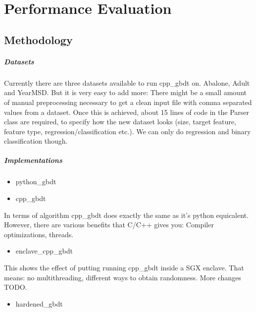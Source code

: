 \chapter{Performance Evaluation}

\section{Methodology}

\paragraph{Datasets}
Currently there are three datasets available to run cpp\_gbdt on. Abalone, Adult and YearMSD. But it is very easy to add more: There might be a small amount of manual preprocessing necessary to get a clean input file with comma separated values from a dataset. Once this is achieved, about 15 lines of code in the Parser class are required, to specify how the new dataset looks (size, target feature, feature type, regression/classification etc.). We can only do regression and binary classification though.

\paragraph{Implementations}

\begin{itemize}
    \item python\_gbdt
\end{itemize}

\begin{itemize}
    \item cpp\_gbdt
\end{itemize}

In terms of algorithm cpp\_gbdt does exactly the same as it's python equicalent. However, there are various benefits that C/C++ gives you: Compiler optimizations, threads.

\begin{itemize}
    \item enclave\_cpp\_gbdt
\end{itemize}

This shows the effect of putting running cpp\_gbdt inside a SGX enclave. That means: no multithreading, different ways to obtain randomness. More changes TODO.

\begin{itemize}
    \item hardened\_gbdt
\end{itemize}

